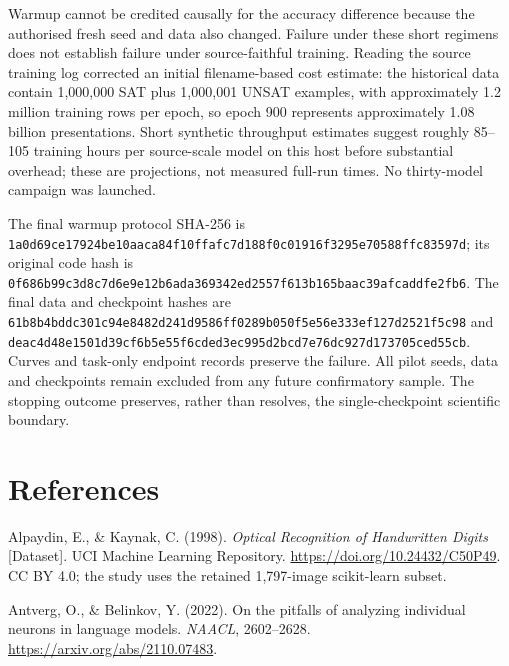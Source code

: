 \documentclass[
  british,
  11pt,
  a4paper,
]{article}
\begin{document}
Warmup cannot be credited causally for the accuracy difference because
the authorised fresh seed and data also changed. Failure under these
short regimens does not establish failure under source-faithful
training. Reading the source training log corrected an initial
filename-based cost estimate: the historical data contain 1,000,000 SAT
plus 1,000,001 UNSAT examples, with approximately 1.2 million training
rows per epoch, so epoch 900 represents approximately 1.08 billion
presentations. Short synthetic throughput estimates suggest roughly
85--105 training hours per source-scale model on this host before
substantial overhead; these are projections, not measured full-run
times. No thirty-model campaign was launched.

The final warmup protocol SHA-256 is
\texttt{1a0d69ce\allowbreak{}17924be1\allowbreak{}0aaca84f\allowbreak{}10ffafc7\allowbreak{}d188f0c0\allowbreak{}1916f329\allowbreak{}5e70588f\allowbreak{}fc83597d};
its original code hash is
\texttt{0f686b99\allowbreak{}c3d8c7d6\allowbreak{}e9e12b6a\allowbreak{}da369342\allowbreak{}ed2557f6\allowbreak{}13b165ba\allowbreak{}ac39afca\allowbreak{}ddfe2fb6}.
The final data and checkpoint hashes are
\texttt{61b8b4bd\allowbreak{}dc301c94\allowbreak{}e8482d24\allowbreak{}1d9586ff\allowbreak{}0289b050\allowbreak{}f5e56e33\allowbreak{}3ef127d2\allowbreak{}521f5c98}
and
\texttt{deac4d48\allowbreak{}e1501d39\allowbreak{}cf6b5e55\allowbreak{}f6cded3e\allowbreak{}c995d2bc\allowbreak{}d7e76dc9\allowbreak{}27d17370\allowbreak{}5ced55cb}.
Curves and task-only endpoint records preserve the failure. All pilot
seeds, data and checkpoints remain excluded from any future confirmatory
sample. The stopping outcome preserves, rather than resolves, the
single-checkpoint scientific boundary.

\section*{References}\label{references}

Alpaydin, E., \& Kaynak, C. (1998). \emph{Optical Recognition of
Handwritten Digits} {[}Dataset{]}. UCI Machine Learning Repository.
\url{https://doi.org/10.24432/C50P49}. CC BY 4.0; the study uses the
retained 1,797-image scikit-learn subset.

Antverg, O., \& Belinkov, Y. (2022). On the pitfalls of analyzing
individual neurons in language models. \emph{NAACL}, 2602--2628.
\url{https://arxiv.org/abs/2110.07483}.
\end{document}
